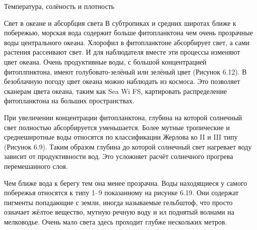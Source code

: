 \begin{chapter}{Температура, солёность и плотность}
\begin{section}{Свет в океане и абсорбция света}
В субтропиках и средних широтах ближе к побережью, морская вода
содержит больше фитопланктона чем очень прозрачные воды центрального
океана. Хлорофил в фитопланктоне абсорбирует свет, а сами растения
рассеивают свет. И для наблюдателя вместе эти процессы изменяют цвет
океана. Очень продуктивные воды, с большой концентрацией
фитоплпнктона, имеют голубовато-зелёный или зелёный цвет (Рисунок
6.12). В безоблачную погоду цвет океана можно наблюдать из
космоса. Это позволяет сканерам цвета океана, таким как Sea Wi FS,
картировать распределение фитопланктона на больших пространствах.
%


При увеличении концентрации фитопланктона, глубина на которой
солнечный свет полностью абсорбируется уменьшается. Более мутные
тропические и среднеширотные воды относятся по классификации Жерлова
ко II и III типу (Рисунок 6.9). Таким образом глубина до которой
солнечный свет нагревает воду зависит от продуктивности вод. Это
усложняет расчёт солнечного прогрева перемешанного слоя.
%

Чем ближе вода к берегу тем она менее прозрачна. Воды находящиеся у
самого побережья относятся к типу 1--9 показанному на рисунке
6.19. Они содержат пигменты попадающие с земли, иногда называемые
гельбштоф, что просто означает жёлтое вещество, мутную речную воду и
ил поднятый волнами на мелководье. Очень мало света здесь проходит
глубже нескольких метров.
%


\end{section}
\end{chapter}
